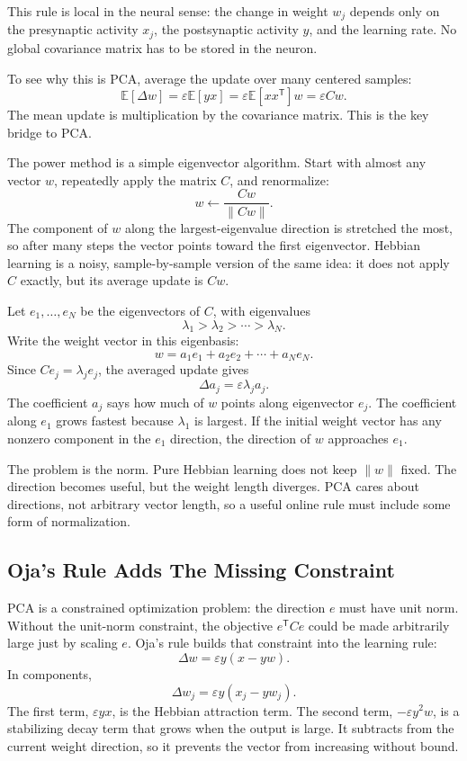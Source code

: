 This rule is local in the neural sense: the change in weight \(w_j\) depends only on the presynaptic activity \(x_j\), the postsynaptic activity \(y\), and the learning rate. No global covariance matrix has to be stored in the neuron.

To see why this is PCA, average the update over many centered samples:
\[
  \mathbb{E}[\Delta w]
  =
  \varepsilon \mathbb{E}[yx]
  =
  \varepsilon \mathbb{E}[xx^{\mathsf{T}}]w
  =
  \varepsilon Cw.
\]
The mean update is multiplication by the covariance matrix. This is the key bridge to PCA.

The power method is a simple eigenvector algorithm. Start with almost any vector \(w\), repeatedly apply the matrix \(C\), and renormalize:
\[
  w\leftarrow \frac{Cw}{\|Cw\|}.
\]
The component of \(w\) along the largest-eigenvalue direction is stretched the most, so after many steps the vector points toward the first eigenvector. Hebbian learning is a noisy, sample-by-sample version of the same idea: it does not apply \(C\) exactly, but its average update is \(Cw\).

Let \(e_1,\dots,e_N\) be the eigenvectors of \(C\), with eigenvalues
\[
  \lambda_1>\lambda_2>\cdots>\lambda_N.
\]
Write the weight vector in this eigenbasis:
\[
  w=a_1e_1+a_2e_2+\cdots+a_Ne_N.
\]
Since \(Ce_j=\lambda_j e_j\), the averaged update gives
\[
  \Delta a_j
  =
  \varepsilon \lambda_j a_j.
\]
The coefficient \(a_j\) says how much of \(w\) points along eigenvector \(e_j\). The coefficient along \(e_1\) grows fastest because \(\lambda_1\) is largest. If the initial weight vector has any nonzero component in the \(e_1\) direction, the direction of \(w\) approaches \(e_1\).

The problem is the norm. Pure Hebbian learning does not keep \(\|w\|\) fixed. The direction becomes useful, but the weight length diverges. PCA cares about directions, not arbitrary vector length, so a useful online rule must include some form of normalization.

\subsection{Oja's Rule Adds The Missing Constraint}

PCA is a constrained optimization problem: the direction \(e\) must have unit norm. Without the unit-norm constraint, the objective \(e^{\mathsf{T}}Ce\) could be made arbitrarily large just by scaling \(e\). Oja's rule builds that constraint into the learning rule:
\[
  \Delta w
  =
  \varepsilon y(x-yw).
\]
In components,
\[
  \Delta w_j
  =
  \varepsilon y(x_j-yw_j).
\]
The first term, \(\varepsilon yx\), is the Hebbian attraction term. The second term, \(-\varepsilon y^2w\), is a stabilizing decay term that grows when the output is large. It subtracts from the current weight direction, so it prevents the vector from increasing without bound.

